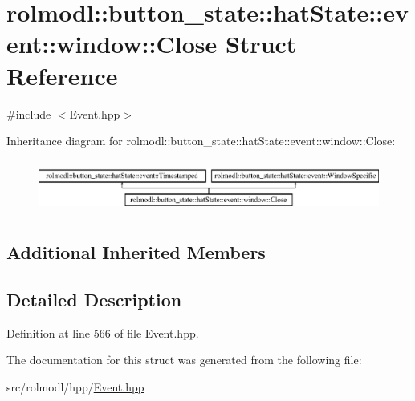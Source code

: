\hypertarget{structrolmodl_1_1button__state_1_1hat_state_1_1event_1_1window_1_1_close}{}\section{rolmodl\+::button\+\_\+state\+::hat\+State\+::event\+::window\+::Close Struct Reference}
\label{structrolmodl_1_1button__state_1_1hat_state_1_1event_1_1window_1_1_close}


{\ttfamily \#include $<$Event.\+hpp$>$}

Inheritance diagram for rolmodl\+::button\+\_\+state\+::hat\+State\+::event\+::window\+::Close\+:\begin{figure}[H]
\begin{center}
\leavevmode
\includegraphics[height=1.761006cm]{structrolmodl_1_1button__state_1_1hat_state_1_1event_1_1window_1_1_close}
\end{center}
\end{figure}
\subsection*{Additional Inherited Members}


\subsection{Detailed Description}


Definition at line 566 of file Event.\+hpp.



The documentation for this struct was generated from the following file\+:\begin{DoxyCompactItemize}
\item 
src/rolmodl/hpp/\mbox{\hyperlink{_event_8hpp}{Event.\+hpp}}\end{DoxyCompactItemize}
